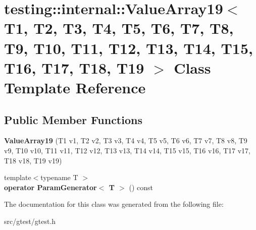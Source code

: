 \hypertarget{classtesting_1_1internal_1_1_value_array19}{}\section{testing\+:\+:internal\+:\+:Value\+Array19$<$ T1, T2, T3, T4, T5, T6, T7, T8, T9, T10, T11, T12, T13, T14, T15, T16, T17, T18, T19 $>$ Class Template Reference}
\label{classtesting_1_1internal_1_1_value_array19}
\subsection*{Public Member Functions}
\begin{DoxyCompactItemize}
\item 
\mbox{\label{classtesting_1_1internal_1_1_value_array19_a1ffcdacd1ffb1d6718187a66458c09e2}} 
{\bfseries Value\+Array19} (T1 v1, T2 v2, T3 v3, T4 v4, T5 v5, T6 v6, T7 v7, T8 v8, T9 v9, T10 v10, T11 v11, T12 v12, T13 v13, T14 v14, T15 v15, T16 v16, T17 v17, T18 v18, T19 v19)
\item 
\mbox{\label{classtesting_1_1internal_1_1_value_array19_a8ddd6c1de46e25310cf844895c7c8cf6}} 
{\footnotesize template$<$typename T $>$ }\\{\bfseries operator Param\+Generator$<$ T $>$} () const
\end{DoxyCompactItemize}


The documentation for this class was generated from the following file\+:\begin{DoxyCompactItemize}
\item 
src/gtest/gtest.\+h\end{DoxyCompactItemize}
